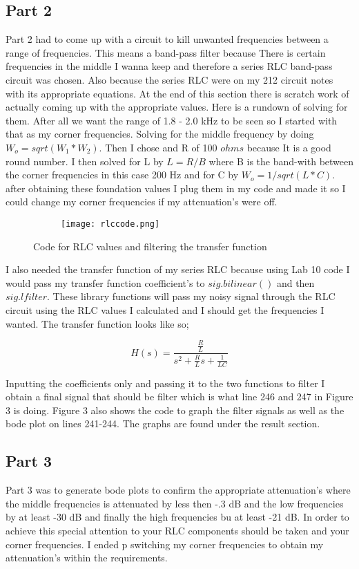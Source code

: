 \documentclass[12pt,a4paper]{article}
\begin{document}
\subsection{Part 2}
Part 2 had to come up with a circuit to kill unwanted frequencies between a range of frequencies. This means a band-pass filter because There is certain frequencies in the middle I wanna keep and therefore a series RLC band-pass circuit was chosen. Also because the series RLC were on my 212 circuit notes with its appropriate equations. At the end of this section there is scratch work of actually coming up with the appropriate values. Here is a rundown of solving for them. After all we want the range of 1.8 - 2.0 kHz to be seen so I started with that as my corner frequencies. Solving for the middle frequency by doing $W_o=sqrt(W_1*W_2)$. Then I chose and R of 100 $ohms$ because It is a good round number. I then solved for L by $L=R/B$ where B is the band-with between the corner frequencies in this case 200 Hz and for C by $W_o=1/sqrt(L*C)$. after obtaining these foundation values I plug them in my code and made it so I could change my corner frequencies if my attenuation's were off.


\begin{figure}[h]
\centering
\begin{subfigure}{ 1\textwidth}
\texttt{[image: rlccode.png]}
\end{subfigure}
\caption{ Code for RLC values and filtering the transfer function}
\label{fig2:image22}
\end{figure}

\clearpage
I also needed the transfer function of my series RLC because using Lab 10 code I would pass my transfer function coefficient's to $sig.bilinear() $ and then $sig.lfilter$. These library functions will pass my noisy signal through the RLC circuit using the RLC values I calculated and I should get the frequencies I wanted. The transfer function looks like so;


\[H(s) = \frac{\frac{R}{L}}{s^{2} + \frac{R}{L}s + \frac{1}{LC}}\]

Inputting the coefficients only and passing it to the two functions to filter I obtain a final signal that should be filter which is what line 246 and 247 in Figure 3 is doing. Figure 3 also shows the code to graph the filter signals as well as the bode plot on lines 241-244. The graphs are found under the result section.




\subsection{Part 3}
Part 3 was to generate bode plots to confirm the appropriate attenuation's where the middle frequencies is attenuated by less then -.3 dB and the low frequencies by at least -30 dB and finally the high frequencies bu at least -21 dB. In order to achieve this special attention to your RLC components should be taken and your corner frequencies. I ended p switching my corner frequencies to obtain my attenuation's within the requirements.
\end{document}
